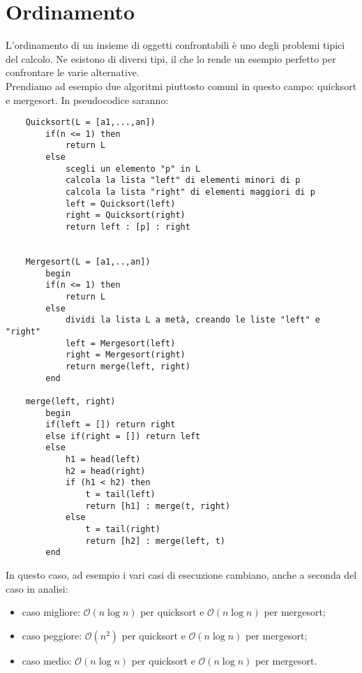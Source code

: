 \section{Ordinamento}
L'ordinamento di un insieme di oggetti confrontabili è uno degli problemi tipici del calcolo. Ne esistono di diversi tipi, il che lo rende un esempio perfetto per confrontare le varie alternative.\\
Prendiamo ad esempio due algoritmi piuttosto comuni in questo campo: quicksort e mergesort. In pseudocodice saranno:
\begin{verbatim}
    Quicksort(L = [a1,...,an])
        if(n <= 1) then
            return L
        else
            scegli un elemento "p" in L
	        calcola la lista "left" di elementi minori di p
	        calcola la lista "right" di elementi maggiori di p
	        left = Quicksort(left)
	        right = Quicksort(right)
	        return left : [p] : right


    Mergesort(L = [a1,..,an])
        begin
        if(n <= 1) then
            return L
        else
            dividi la lista L a metà, creando le liste "left" e "right" 
            left = Mergesort(left)
            right = Mergesort(right)
            return merge(left, right)
        end
        
    merge(left, right)
        begin
        if(left = []) return right
        else if(right = []) return left
        else
            h1 = head(left)
            h2 = head(right)
            if (h1 < h2) then
                t = tail(left)
                return [h1] : merge(t, right)
            else
                t = tail(right)
                return [h2] : merge(left, t)
        end
\end{verbatim}
In questo caso, ad esempio i vari casi di esecuzione cambiano, anche a seconda del caso in analisi:
\begin{itemize}
\item{caso migliore:  $\mathcal {O}(n \log {}n)$ per quicksort e  $\mathcal {O}(n \log {}n)$ per mergesort;}
\item{caso peggiore:  $\mathcal {O}(n^2)$ per quicksort e  $\mathcal {O}(n \log {}n)$ per mergesort;}
\item{caso medio:  $\mathcal {O}(n \log {}n)$ per quicksort e  $\mathcal {O}(n \log {}n)$ per mergesort.}
\end{itemize}
